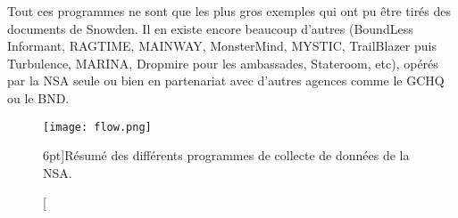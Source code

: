Tout ces programmes ne sont que les plus gros exemples qui ont pu
être tirés des documents de Snowden. Il en existe encore beaucoup d'autres
(BoundLess Informant, RAGTIME, MAINWAY, MonsterMind, MYSTIC, TrailBlazer puis
Turbulence, MARINA, Dropmire pour les ambassades, Stateroom, etc), opérés par
la NSA seule ou bien en partenariat avec d'autres agences comme le GCHQ ou le
BND.

\vspace{0.8cm}
\begin{figure}
\texttt{[image: flow.png]}
\caption[Infographie résumant les différents programmes de
surveillance américains][6pt]{Résumé des différents programmes de collecte de
données de la NSA.}
\label{fig:infographie}
\end{figure}